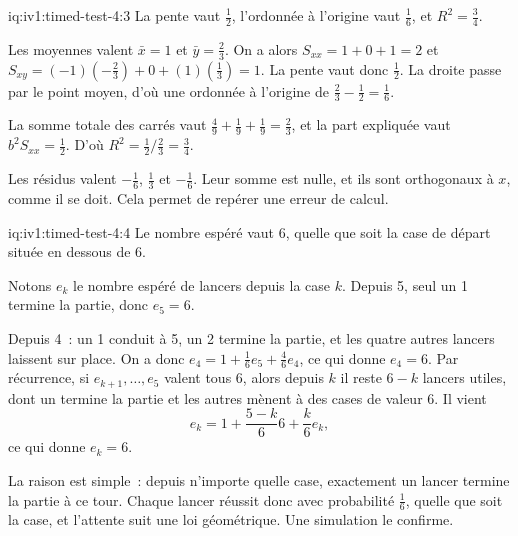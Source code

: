 \enlargethispage{-3\baselineskip}%
\begin{solution}{iq:iv1:timed-test-4:3}
La pente vaut $\frac12$, l'ordonnée à l'origine vaut $\frac16$, et $R^2 = \frac34$.

Les moyennes valent $\bar{x} = 1$ et $\bar{y} = \frac23$. On a alors $S_{xx} = 1 + 0 + 1 = 2$ et $S_{xy} = (-1)(-\frac23) + 0 + (1)(\frac13) = 1$. La pente vaut donc $\frac12$. La droite passe par le point moyen, d'où une ordonnée à l'origine de $\frac23 - \frac12 = \frac16$.

La somme totale des carrés vaut $\frac49 + \frac19 + \frac19 = \frac23$, et la part expliquée vaut $b^2S_{xx} = \frac12$. D'où $R^2 = \frac12/\frac23 = \frac34$.

Les résidus valent $-\frac16$, $\frac13$ et $-\frac16$. Leur somme est nulle, et ils sont orthogonaux à $x$, comme il se doit. Cela permet de repérer une erreur de calcul.

\end{solution}

\begin{solution}{iq:iv1:timed-test-4:4}
Le nombre espéré vaut 6, quelle que soit la case de départ située en dessous de 6.

Notons $e_k$ le nombre espéré de lancers depuis la case $k$. Depuis 5, seul un 1 termine la partie, donc $e_5 = 6$.

Depuis 4~: un 1 conduit à 5, un 2 termine la partie, et les quatre autres lancers laissent sur place. On a donc $e_4 = 1 + \frac16e_5 + \frac46e_4$, ce qui donne $e_4 = 6$. Par récurrence, si $e_{k + 1}, \dots, e_5$ valent tous 6, alors depuis $k$ il reste $6 - k$ lancers utiles, dont un termine la partie et les autres mènent à des cases de valeur 6. Il vient
\[
e_k = 1 + \frac{5 - k}{6}6 + \frac{k}{6}e_k,
\]
ce qui donne $e_k = 6$.

La raison est simple~: depuis n'importe quelle case, exactement un lancer termine la partie à ce tour. Chaque lancer réussit donc avec probabilité $\frac16$, quelle que soit la case, et l'attente suit une loi géométrique. Une simulation le confirme.

\end{solution}


